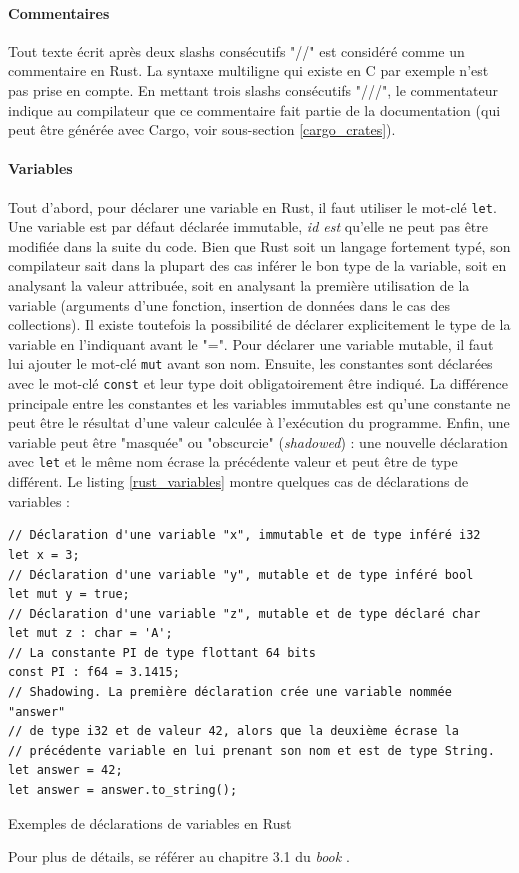 \paragraph{Commentaires}
Tout texte écrit après deux slashs consécutifs "//" est considéré comme un commentaire en Rust.
La syntaxe multiligne qui existe en C par exemple n'est pas prise en compte. En mettant trois slashs 
consécutifs "///", le commentateur indique au compilateur que ce commentaire fait partie de la 
documentation (qui peut être générée avec Cargo, voir sous-section \ref{cargo_crates}).

\paragraph{Variables}
Tout d'abord, pour déclarer une variable en Rust, il faut utiliser le mot-clé \texttt{let}. Une variable 
est par défaut déclarée immutable, \textit{id est} qu'elle ne peut pas être modifiée dans la suite du 
code. Bien que Rust soit un langage fortement typé, son compilateur sait dans la plupart des cas 
inférer le bon type de la variable, soit en analysant la valeur attribuée, soit en analysant la 
première utilisation de la variable (arguments d'une fonction, insertion de données dans le cas 
des collections). Il existe toutefois la possibilité de déclarer explicitement le type de la variable 
en l'indiquant avant le "=". Pour déclarer une variable mutable, il faut lui ajouter le mot-clé 
\texttt{mut} avant son nom. Ensuite, les constantes sont déclarées avec le mot-clé \texttt{const} 
et leur type doit obligatoirement être indiqué. La différence principale entre les constantes et 
les variables immutables est qu'une constante ne peut être le résultat d'une valeur calculée à 
l'exécution du programme. Enfin, une variable peut être "masquée" ou "obscurcie" (\textit{shadowed}) : 
une nouvelle déclaration avec \texttt{let} et le même nom écrase la précédente valeur et 
peut être de type différent. Le listing \ref{rust_variables} montre quelques cas de déclarations de variables :
\bigbreak
\begin{code}
    \begin{verbatim}
// Déclaration d'une variable "x", immutable et de type inféré i32
let x = 3;
// Déclaration d'une variable "y", mutable et de type inféré bool
let mut y = true;
// Déclaration d'une variable "z", mutable et de type déclaré char
let mut z : char = 'A';
// La constante PI de type flottant 64 bits
const PI : f64 = 3.1415;
// Shadowing. La première déclaration crée une variable nommée "answer"
// de type i32 et de valeur 42, alors que la deuxième écrase la 
// précédente variable en lui prenant son nom et est de type String.
let answer = 42;
let answer = answer.to_string();
    \end{verbatim}
    \caption{Exemples de déclarations de variables en Rust}
    \label{rust_variables}
\end{code}
\bigbreak
Pour plus de détails, se référer au chapitre 3.1 du \textit{book} \cite{ref0}.

